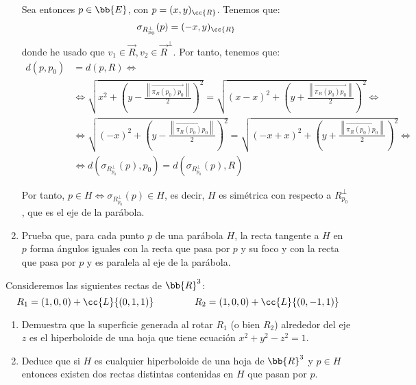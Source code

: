 \begin{ejercicio}
\begin{enumerate}
    Sea entonces $p\in \bb{E}$, con $p=(x,y)_{\cc{R}}$. Tenemos que:
    \begin{equation*}
        \sigma_{R_{p_0}^\perp}(p)= (-x,y)_{\cc{R}}
    \end{equation*}
    donde he usado que $v_1\in \vec{R}, v_2 \in \vec{R}^\perp$. Por tanto, tenemos que:
    \begin{align*}
        d(p, p_0) &= d(p, R) \Longleftrightarrow \\&\Longleftrightarrow
        \sqrt{x^2 + \left(y-\frac{\left\|\vec{\pi_R(p_0)p_0}\right\|}{2}\right)^2} = \sqrt{(x-x)^2 + \left(y+\frac{\left\|\vec{\pi_R(p_0)p_0}\right\|}{2}\right)^2} \Longleftrightarrow \\ & \Longleftrightarrow
        \sqrt{(-x)^2 + \left(y-\frac{\left\|\vec{\pi_R(p_0)p_0}\right\|}{2}\right)^2} = \sqrt{(-x+x)^2 + \left(y+\frac{\left\|\vec{\pi_R(p_0)p_0}\right\|}{2}\right)^2} \Longleftrightarrow \\ & \Longleftrightarrow
        d(\sigma_{R_{p_0}^\perp}(p), p_0) = d(\sigma_{R_{p_0}^\perp}(p), R)
    \end{align*}

    Por tanto, $p\in H \Longleftrightarrow \sigma_{R_{p_0}^\perp}(p)\in H$, es decir, $H$ es simétrica con respecto a $R_{p_0}^\perp$, que es el eje de la parábola.

    \item Prueba que, para cada punto $p$ de una parábola $H$, la recta tangente a $H$ en $p$ forma ángulos iguales con la recta que pasa por $p$ y su foco y con la recta que pasa por $p$ y es paralela al eje de la parábola.
\end{enumerate}
\end{ejercicio}

\begin{ejercicio}
    Consideremos las siguientes rectas de $\bb{R}^3$:
    \begin{equation*}
        R_1 = (1, 0, 0) + \cc{L}\{(0, 1, 1)\}\hspace{1.5cm}
        R_2 = (1, 0, 0) + \cc{L}\{(0, -1, 1)\}
    \end{equation*}
    \begin{enumerate}
        \item  Demuestra que la superficie generada al rotar $R_1$ (o bien $R_2$) alrededor del eje $z$ es el hiperboloide de una hoja que tiene ecuación $x^2+y^2-z^2=1$.

        \item Deduce que si $H$ es cualquier hiperboloide de una hoja de $\bb{R}^3$ y $p \in H$ entonces existen dos rectas distintas contenidas en $H$ que pasan por $p$.
    \end{enumerate}
\end{ejercicio}


